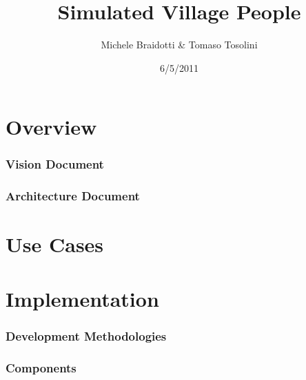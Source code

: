 \documentclass[a4paper,10pt]{book}
\date{6/5/2011}
\author{Michele Braidotti \& Tomaso Tosolini}
\title{Simulated Village People}
\begin{document}
\maketitle

\tableofcontents

\part{Overview}
	\section{Vision Document}
    		
	\section{Architecture Document}
		
\part{Use Cases}
	
\part{Implementation}
	\section{Development Methodologies}
		
	\section{Components}
		
\end{document}
